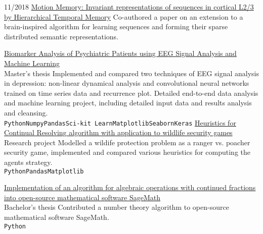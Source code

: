 \documentclass[9pt]{developercv} %
\begin{document}
\begin{entrylist}
	\entry
	  {11/2018}
	  {\href{https://www.sciencedirect.com/science/article/pii/S1877050918323792}{Motion Memory: Invariant representations of sequences in cortical L2/3 by Hierarchical Temporal Memory}}
	  {}
	  {Co-authored a paper on an extension to a brain-inspired algorithm for learning sequences and forming their sparse distributed semantic representations.}
\end{entrylist}


\begin{entrylist}
	\entry
		{}
		{\href{https://www.scribd.com/document/414005885/Biomarker-Analysis-of-Psychiatric-Patients-using-EEG-Signal-Analysis-and-Machine-Learning}{Biomarker Analysis of Psychiatric Patients using EEG Signal Analysis and Machine Learning}}
		{\\Master's thesis}
		{Implemented and compared two techniques of EEG signal analysis in depression: non-linear dynamical analysis and convolutional neural networks trained on time series data and recurrence plot. Detailed end-to-end data analysis and machine learning project, including detailed input data and results analysis and cleansing. \\
         \texttt{Python}\slashsep\texttt{Numpy}\slashsep\texttt{Pandas}\slashsep\texttt{Sci-kit Learn}\slashsep\texttt{Matplotlib}\slashsep\texttt{Seaborn}\slashsep\texttt{Keras}}
	\entry
		{}
		{\href{https://www.scribd.com/document/372696825/Continual-resolving-heuristics-for-the-PAWS-domain}{Heuristics for Continual Resolving algorithm with application to wildlife security games}}
		{\\Research project}
		{Modelled a wildife protection problem as a ranger vs. poacher security game, implemented and compared various heuristics for computing the agents strategy.\\
         \texttt{Python}\slashsep\texttt{Pandas}\slashsep\texttt{Matplotlib}
        }

	\entry
		{}
		{\href{}{Implementation of an algorithm for algebraic operations with continued fractions into open-source mathematical software SageMath}}
		{\\Bachelor's thesis}
		{Contributed a number theory algorithm to open-source mathematical software SageMath.
         \\\texttt{Python}
        }


\end{entrylist}
\end{document}
